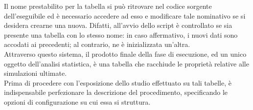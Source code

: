 Il nome prestabilito per la tabella si può ritrovare nel codice sorgente dell'eseguibile ed è necessario accedere ad esso e modificare tale nominativo se si desidera crearne una nuova. Difatti, all'avvio dello script è controllato se sia presente una tabella con lo stesso nome: in caso affermativo, i nuovi dati sono accodati ai precedenti; al contrario, ne è inizializzata un'altra.\\  
Attraverso questo sistema, il prodotto finale della fase di esecuzione, ed un unico oggetto dell'analisi statistica, è una tabella che racchiude le proprietà relative alle simulazioni ultimate. \\
Prima di procedere con l'esposizione dello studio effettuato su tali tabelle, è indispensabile perfezionare la descrizione del procedimento, specificando le opzioni di configurazione su cui essa si struttura.  

